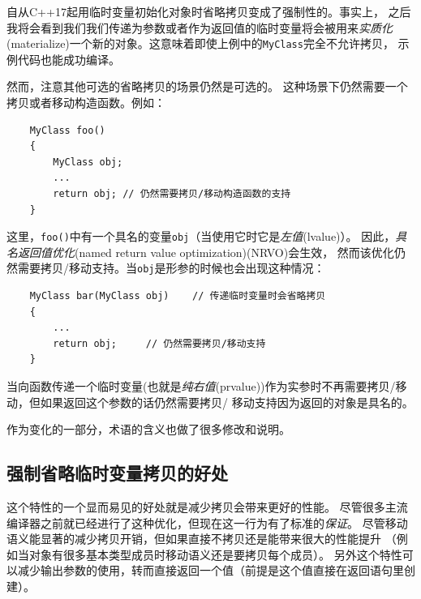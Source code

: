 自从C++17起用临时变量初始化对象时省略拷贝变成了强制性的。事实上，
之后我将会看到我们我们传递为参数或者作为返回值的临时变量将会被用来\emph{实质化}
(materialize)一个新的对象。这意味着即使上例中的\texttt{MyClass}完全不允许拷贝，
示例代码也能成功编译。

然而，注意其他可选的省略拷贝的场景仍然是可选的。
这种场景下仍然需要一个拷贝或者移动构造函数。例如：
\begin{lstlisting}
    MyClass foo()
    {
        MyClass obj;
        ...
        return obj; // 仍然需要拷贝/移动构造函数的支持
    }
\end{lstlisting}
这里，\texttt{foo()}中有一个具名的变量\texttt{obj}（当使用它时它是\emph{左值}(lvalue)）。
因此，\emph{具名返回值优化}(named return value optimization)(NRVO)会生效，
然而该优化仍然需要拷贝/移动支持。当\texttt{obj}是形参的时候也会出现这种情况：
\begin{lstlisting}
    MyClass bar(MyClass obj)    // 传递临时变量时会省略拷贝
    {
        ...
        return obj;     // 仍然需要拷贝/移动支持
    }
\end{lstlisting}
当向函数传递一个临时变量(也就是\emph{纯右值}(prvalue))作为实参时不再需要拷贝/移动，但如果返回这个参数的话仍然需要拷贝/
移动支持因为返回的对象是具名的。

作为变化的一部分，术语的含义也做了很多修改和说明。

\subsection{强制省略临时变量拷贝的好处}
这个特性的一个显而易见的好处就是减少拷贝会带来更好的性能。
尽管很多主流编译器之前就已经进行了这种优化，但现在这一行为有了标准的\emph{保证}。
尽管移动语义能显著的减少拷贝开销，但如果直接不拷贝还是能带来很大的性能提升
（例如当对象有很多基本类型成员时移动语义还是要拷贝每个成员）。
另外这个特性可以减少输出参数的使用，转而直接返回一个值（前提是这个值直接在返回语句里创建）。

